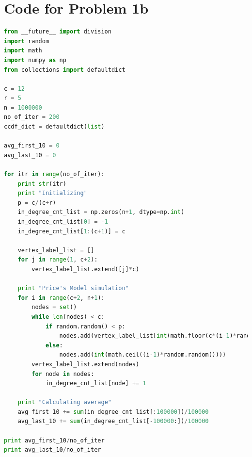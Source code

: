 \documentclass{article}
\begin{document}
\newpage
\section*{Code for Problem 1b}
\begin{lstlisting}[language=Python, breaklines=true]
from __future__ import division
import random
import math
import numpy as np
from collections import defaultdict

c = 12
r = 5
n = 1000000
no_of_iter = 200
ccdf_dict = defaultdict(list)

avg_first_10 = 0
avg_last_10 = 0

for itr in range(no_of_iter):
    print str(itr)
    print "Initializing"
    p = c/(c+r)
    in_degree_cnt_list = np.zeros(n+1, dtype=np.int)
    in_degree_cnt_list[0] = -1
    in_degree_cnt_list[1:(c+1)] = c
    
    vertex_label_list = []
    for j in range(1, c+2):
        vertex_label_list.extend([j]*c)

    print "Price's Model simulation"
    for i in range(c+2, n+1):
        nodes = set()
        while len(nodes) < c:
            if random.random() < p:
                nodes.add(vertex_label_list[int(math.floor(c*(i-1)*random.random()))])
            else:
                nodes.add(int(math.ceil((i-1)*random.random())))
        vertex_label_list.extend(nodes)
        for node in nodes:
            in_degree_cnt_list[node] += 1
    
    print "Calculating average"
    avg_first_10 += sum(in_degree_cnt_list[:100000])/100000
    avg_last_10 += sum(in_degree_cnt_list[-100000:])/100000    

print avg_first_10/no_of_iter
print avg_last_10/no_of_iter
\end{lstlisting}

\newpage
\end{document}
